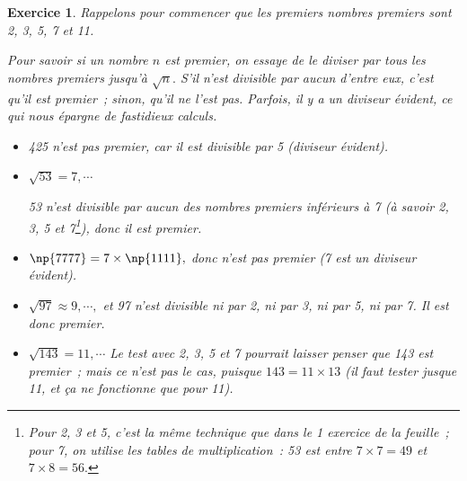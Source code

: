\documentclass[10pt]{article}
\newtheorem{exo}{Exercice}
\begin{document}
\begin{exo}

Rappelons pour commencer que les premiers nombres premiers sont 2, 3, 5, 7 et 11.

\medskip

Pour savoir si un nombre $n$ est premier, on essaye de le diviser par tous les nombres premiers jusqu'à $\sqrt{n}.$ S'il n'est divisible par aucun d'entre eux, c'est qu'il est premier~; sinon, qu'il ne l'est pas. Parfois, il y a un diviseur évident, ce qui nous épargne de fastidieux calculs.

\medskip

\begin{itemize}
\item[\textbullet] 425 n'est pas premier, car il est divisible par 5 (diviseur évident).
\item[\textbullet] $\sqrt{53}=7,\cdots$ 

53 n'est divisible par aucun des nombres premiers inférieurs à 7 (à savoir 2, 3, 5 et 7\footnote{Pour 2, 3 et 5, c'est la même technique que dans le 1 exercice de la feuille~; pour 7, on utilise les tables de multiplication~: 53 est entre $7\times 7=49$ et $7\times 8=56.$}), donc il est premier.
\item[\textbullet] $\np{7777}=7\times\np{1111},$ donc  n'est pas premier (7 est un diviseur évident).
\item[\textbullet] $\sqrt{97}\approx 9,\cdots,$ et 97 n'est divisible ni par 2, ni par 3, ni par 5, ni par 7. Il est donc premier.
\item[\textbullet] $\sqrt{143}=11,\cdots$ Le test avec 2, 3, 5 et 7 pourrait laisser penser que 143 est premier~; mais ce n'est pas le cas, puisque $143=11\times 13$ (il faut tester jusque 11, et ça ne fonctionne que pour 11).
\end{itemize}


\end{exo}
\end{document}
